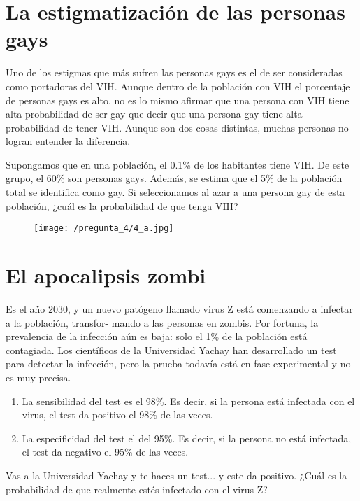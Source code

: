 \documentclass[a4paper]{article}
\begin{document}
\newpage
	
\section*{La estigmatización de las personas gays}

Uno de los estigmas que más sufren las personas gays es el de ser consideradas como portadoras del VIH. Aunque dentro de la población con VIH el porcentaje de personas gays es alto, no es lo mismo afirmar que una persona con VIH tiene alta probabilidad de ser gay que decir que una persona gay tiene alta probabilidad de tener VIH. Aunque son dos cosas distintas, muchas personas no logran entender la diferencia.

Supongamos que en una población, el 0.1\% de los habitantes tiene VIH. De este grupo, el 60\% son personas gays. Además, se estima que el 5\% de la población total se identifica como gay. Si seleccionamos al azar a una persona gay de esta población, ¿cuál es la probabilidad de que tenga VIH?

\begin{figure}[H]
	\texttt{[image: /pregunta\_4/4\_a.jpg]}
\end{figure}


\section*{El  apocalipsis zombi}

Es el año 2030, y un nuevo patógeno llamado virus Z está comenzando a infectar a la población, transfor-
mando a las personas en zombis. Por fortuna, la prevalencia de la infección aún es baja: solo el 1\% de la población está contagiada. Los científicos de la Universidad Yachay han desarrollado un test para detectar la infección, pero la prueba todavía está en fase experimental y no es muy precisa.

\begin{enumerate}[label=•]
	\item La sensibilidad del test es el 98\%. Es decir, si la persona está infectada con el virus, el test da positivo el 98\% de las veces.
	\item La especificidad del test el del 95\%. Es decir, si la persona no está infectada, el test da negativo el 95\% de las veces.
\end{enumerate}

Vas a la Universidad Yachay y te haces un test... y este da positivo. ¿Cuál es la probabilidad de que realmente estés infectado con el virus Z?
\end{document}
